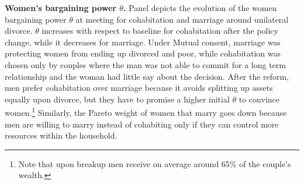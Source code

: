 \documentclass[12pt]{article}
\numberwithin{table}{section}
\begin{document}

\textbf{Women's bargaining power $\theta$.} Panel  depicts the evolution of the women bargaining power $\theta$ at meeting for cohabitation and marriage around unilateral divorce. $\theta$ increases with respect to baseline for cohabitation after the policy change, while it decreases for marriage. Under Mutual consent, marriage was protecting women from ending up divorced and poor, while cohabitation was chosen only by couples where the man was not able to commit for a long term relationship and the woman had little say about the decision. After the reform, men prefer cohabitation over marriage because it avoids splitting up assets equally upon divorce, but they have to promise a higher initial $\theta$ to convince women.\footnote{Note that upon breakup men receive on average around 65\% of the couple's wealth.} Similarly, the Pareto weight of women that marry goes down because men are willing to marry instead of cohabiting only if they can control more resources within the household.

\end{document}
